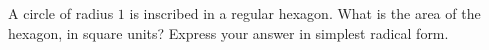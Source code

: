 A circle of radius $1$ is inscribed in a regular hexagon. What is the area of the hexagon, in square units? Express your answer in simplest radical form.
